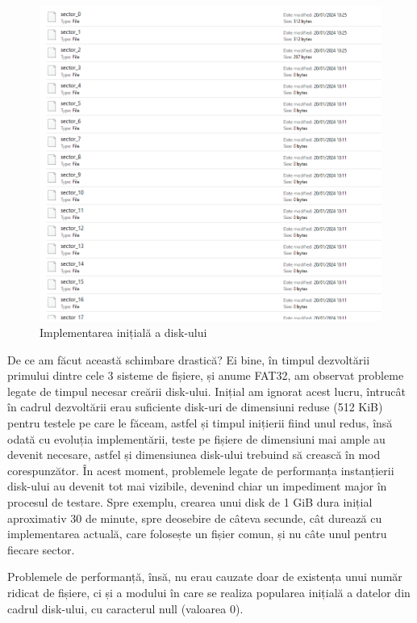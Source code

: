 \begin{figure}[h]
    \centering
    \includegraphics[width=1.0\linewidth]{images/2.3.png}
    \caption{Implementarea inițială a disk-ului}
    \label{fig:enter-label}
\end{figure}

\bigskip

De ce am făcut această schimbare drastică? Ei bine, în timpul dezvoltării primului dintre cele 3 sisteme de fișiere, și anume FAT32, am observat probleme legate de timpul necesar creării disk-ului. Inițial am ignorat acest lucru, întrucât în cadrul dezvoltării erau suficiente disk-uri de dimensiuni reduse (512 KiB) pentru testele pe care le făceam, astfel și timpul inițierii fiind unul redus, însă odată cu evoluția implementării, teste pe fișiere de dimensiuni mai ample au devenit necesare, astfel și dimensiunea disk-ului trebuind să crească în mod corespunzător. În acest moment, problemele legate de performanța instanțierii disk-ului au devenit tot mai vizibile, devenind chiar un impediment major în procesul de testare. Spre exemplu, crearea unui disk de 1 GiB dura inițial aproximativ 30 de minute, spre deosebire de câteva secunde, cât durează cu implementarea actuală, care folosește un fișier comun, și nu câte unul pentru fiecare sector.

Problemele de performanță, însă, nu erau cauzate doar de existența unui număr ridicat de fișiere, ci și a modului în care se realiza popularea inițială a datelor din cadrul disk-ului, cu caracterul null (valoarea 0).

